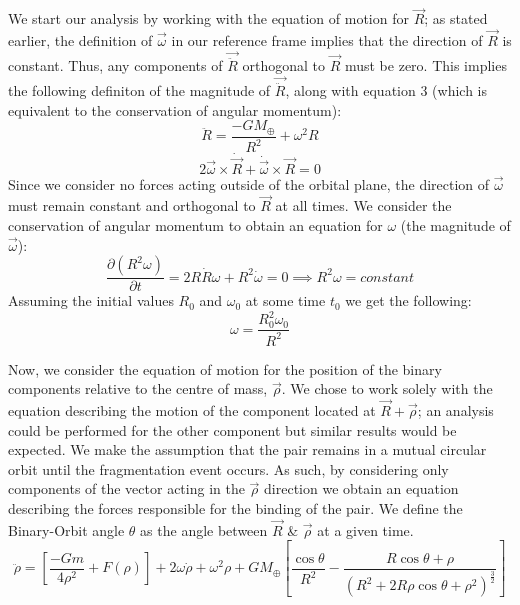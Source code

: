 \documentclass[letterpaper, preprint, paper,11pt]{AAS}	%
\begin{document}
We start our analysis by working with the equation of motion for $\vec{R}$; as stated earlier, the definition of $\vec{\omega}$ in our reference frame implies that the direction of $\vec{R}$ is constant. Thus, any components of $\vec{\ddot{R}}$ orthogonal to $\vec{R}$ must be zero. This implies the following definiton of the magnitude of $\vec{\ddot{R}}$, along with equation 3 (which is equivalent to the conservation of angular momentum): 
\begin{equation}
\ddot{R} = \frac{-GM_\oplus}{R^{2}}+\omega^{2}R
\end{equation}
\begin{equation}
2\vec{\omega}\times\dot{\vec{R}}+\dot{\vec{\omega}}\times\vec{R}=0
\end{equation}
Since we consider no forces acting outside of the orbital plane, the direction of $\vec{\omega}$ must remain constant and orthogonal to $\vec{R}$ at all times. We consider the conservation of angular momentum to obtain an equation for $\omega$ (the magnitude of $\vec{\omega}$):
\begin{equation}
\frac{\partial\left(R^{2}\omega\right)}{\partial t} = 2R\dot{R}\omega + R^{2}\dot{\omega} = 0 \implies R^{2}\omega = constant
\end{equation}
Assuming the initial values $R_0$ and $\omega_0$ at some time $t_0$ we get the following:
\begin{equation}
\omega = \frac{R_0^{2}\omega_0}{R^{2}}
\end{equation}

Now, we consider the equation of motion for the position of the binary components relative to the centre of mass, $\vec{\rho}$. We chose to work solely with the equation describing the motion of the component located at $\vec{R}+\vec{\rho}$; an analysis could be performed for the other component but similar results would be expected. We make the assumption that the pair remains in a mutual circular orbit until the fragmentation event occurs. As such, by considering only components of the vector acting in the $\vec{\rho}$ direction we obtain an equation describing the forces responsible for the binding of the pair. We define the Binary-Orbit angle $\theta$ as the angle between $\vec{R}$ \& $\vec{\rho}$ at a given time.
\begin{equation}\label{eq:rdd}
\ddot{\rho} = \left[\frac{-Gm}{4\rho^{2}}+F(\rho)\right]+2\omega\dot{\rho}+\omega^{2}\rho+{GM_\oplus}\left[\frac{\cos\theta}{R^{2}}-\frac{R\cos\theta+\rho}{(R^{2}+2R\rho\cos\theta+\rho^{2})^\frac{3}{2}}\right]
\end{equation}
\end{document}
